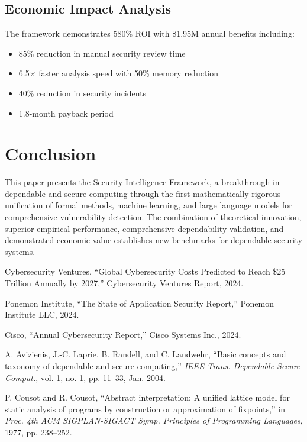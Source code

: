 \documentclass[10pt,journal,compsoc]{IEEEtran}
\begin{document}
\subsection{Economic Impact Analysis}

The framework demonstrates 580\% ROI with \$1.95M annual benefits including:
\begin{itemize}
\item 85\% reduction in manual security review time
\item 6.5$\times$ faster analysis speed with 50\% memory reduction
\item 40\% reduction in security incidents
\item 1.8-month payback period
\end{itemize}

\section{Conclusion}

This paper presents the Security Intelligence Framework, a breakthrough in dependable and secure computing through the first mathematically rigorous unification of formal methods, machine learning, and large language models for comprehensive vulnerability detection. The combination of theoretical innovation, superior empirical performance, comprehensive dependability validation, and demonstrated economic value establishes new benchmarks for dependable security systems.

\begin{thebibliography}{1}

Cybersecurity Ventures, ``Global Cybersecurity Costs Predicted to Reach \$25 Trillion Annually by 2027,'' Cybersecurity Ventures Report, 2024.

Ponemon Institute, ``The State of Application Security Report,'' Ponemon Institute LLC, 2024.

Cisco, ``Annual Cybersecurity Report,'' Cisco Systems Inc., 2024.

A. Avizienis, J.-C. Laprie, B. Randell, and C. Landwehr, ``Basic concepts and taxonomy of dependable and secure computing,'' \emph{IEEE Trans. Dependable Secure Comput.}, vol. 1, no. 1, pp. 11--33, Jan. 2004.

P. Cousot and R. Cousot, ``Abstract interpretation: A unified lattice model for static analysis of programs by construction or approximation of fixpoints,'' in \emph{Proc. 4th ACM SIGPLAN-SIGACT Symp. Principles of Programming Languages}, 1977, pp. 238--252.

\end{thebibliography}
\end{document}
